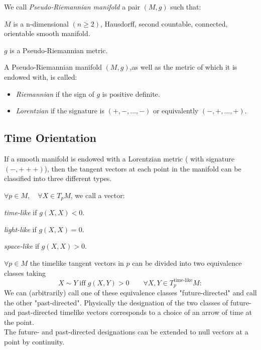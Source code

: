 \documentclass[Main]{subfiles}
\begin{document}
			\begin{definition}
				We call \emph{Pseudo-Riemannian manifold} a pair $(M, g)$ such that:
				\begin{compactitemize}
					\item $M$ is a n-dimensional $(n\geq2)$, Hausdorff, second countable, connected, orientable smooth manifold.
					\item $g$ is a Pseudo-Riemannian metric.
				\end{compactitemize}
			\end{definition}		
			A Pseudo-Riemannian manifold $(M,g)$,as well as the metric of which it is endowed with, is called:
				 \begin{itemize}
				 	\item \emph{Riemannian} if the sign of $g$ is positive definite.%
				 	\item \emph{Lorentzian} if the signature is $(+, -, \ldots,- )$ or equivalently $(-,+,\ldots,+)$.
				 \end{itemize}
		
		\subsection{Time Orientation}
			If a smooth manifold is endowed with a Lorentzian metric ( with signature $(-,+++)$), then the tangent vectors at each point in the manifold can be classified into three different types. 
			\begin{notationfix}

				$\forall p \in M, \quad \forall X \in T_pM$,  we call a vector:
				\begin{compactitemize}
					\item \emph{time-like} if $g(X,X)<0$.
					\item \emph{light-like} if $g(X,X)=0$.
					\item \emph{space-like} if $g(X,X)>0$.
				\end{compactitemize}
			\end{notationfix}
		
			\begin{observation}%
			
				$\forall p\in M$ the timelike tangent vectors in $p$ can be divided into two equivalence classes taking
				\begin{displaymath}
					X \sim Y \; \textrm{iff} \; g(X,Y)>0 \qquad \forall X,Y \in T^\textrm{time-like}_pM:
				\end{displaymath}
				We can (arbitrarily) call one of these equivalence classes "future-directed" and call the other "past-directed". Physically the designation of the two classes of future- and past-directed timelike vectors corresponds to a choice of an arrow of time at the point.
				\\
				The future- and past-directed designations can be extended to null vectors at a point by continuity.
			\end{observation}
	
\end{document}
